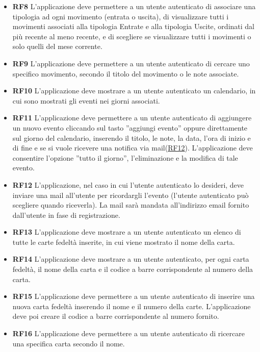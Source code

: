 \documentclass[a4paper,12pt]{article}
\begin{document}
\begin{itemize}
\item \textbf {\hypertarget{RF8}{RF8}} L'applicazione deve permettere a un utente autenticato di associare una tipologia ad ogni movimento (entrata o uscita), di visualizzare tutti i movimenti associati alla tipologia Entrate e alla tipologia Uscite, ordinati dal più recente al meno recente, e di scegliere se visualizzare tutti i movimenti o solo quelli del mese corrente.
\item \textbf {\hypertarget{RF9}{RF9}} L'applicazione deve permettere a un utente autenticato di cercare uno specifico movimento, secondo il titolo del movimento o le note associate.
\item \textbf {\hypertarget{RF10}{RF10}} L'applicazione deve mostrare a un utente autenticato un calendario, in cui sono mostrati gli eventi nei giorni associati.
\item \textbf {\hypertarget{RF11}{RF11}} L'applicazione deve permettere a un utente autenticato di aggiungere un nuovo evento cliccando sul tasto ''aggiungi evento'' oppure direttamente sul giorno del calendario, inserendo il titolo, le note, la data, l'ora di inizio e di fine e se si vuole ricevere una notifica via mail(\hyperlink{RF12}{RF12}). L'applicazione deve consentire l'opzione ''tutto il giorno'', l'eliminazione e la modifica di tale evento.
\item \textbf {\hypertarget{RF12}{RF12}} L'applicazione, nel caso in cui l'utente autenticato lo desideri, deve inviare una mail all'utente per ricordargli l'evento (l'utente autenticato può scegliere quando riceverla). La mail sarà mandata all'indirizzo email fornito dall'utente in fase di registrazione.
\item \textbf {\hypertarget{RF13}{RF13}} L'applicazione deve mostrare a un utente autenticato un elenco di tutte le carte fedeltà inserite, in cui viene mostrato il nome della carta.
\item \textbf {\hypertarget{RF14}{RF14}} L'applicazione deve mostrare a un utente autenticato, per ogni carta fedeltà, il nome della carta e il codice a barre corrispondente al numero della carta.
\item \textbf {\hypertarget{RF15}{RF15}} L'applicazione deve permettere a un utente autenticato di inserire una nuova carta fedeltà inserendo il nome e il numero della carte. L'applicazione deve poi creare il codice a barre corrispondente al numero fornito.
\item \textbf {\hypertarget{RF16}{RF16}} L'applicazione deve permettere a un utente autenticato di ricercare una specifica carta secondo il nome.

\end{itemize}
\end{document}

